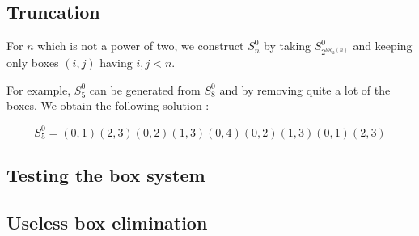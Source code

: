 \documentclass[11pt, a4paper]{article}
\begin{document}
\subsection{Truncation}

For $n$ which is not a power of two, we construct $S_n^0$ by taking
$S_{2^{log_2(n)}}^0$ and keeping only boxes $(i, j)$ having $i, j < n$.

For example, $S_5^0$ can be generated from $S_8^0$ and by removing quite a lot
of the boxes. We obtain the following solution :

$$S_5^0 = (0,1)(2,3)(0,2)(1,3)(0,4)(0,2)(1,3)(0,1)(2,3)$$

\subsection{Testing the box system}

\subsection{Useless box elimination}
\end{document}
